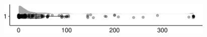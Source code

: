 \documentclass[
]{article}
\begin{document}
\begin{minipage}[t]{0.3\linewidth}

~

\end{minipage}%
\begin{minipage}[t]{0.7\linewidth}

\includegraphics[width=396px]{codebook_template_files/figure-latex/q7_26_rainplot-1}

\end{minipage}
 \vspace*{-5mm} 

\begin{minipage}[t]{0.3\linewidth}

~

\end{minipage}%
\begin{minipage}[t]{0.7\linewidth}

~

\end{minipage}
 \vspace*{-7mm} 
\end{document}

